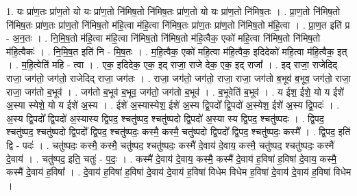 \documentclass[17pt]{extarticle}
\begin{document}
1. यः प्रा॑ण॒तः प्रा॑ण॒तो यो यः प्रा॑ण॒तो नि॑मिष॒तो नि॑मिष॒तः प्रा॑ण॒तो यो यः प्रा॑ण॒तो नि॑मिष॒तः । . प्रा॒ण॒तो नि॑मिष॒तो नि॑मिष॒तः प्रा॑ण॒तः प्रा॑ण॒तो नि॑मिष॒तो म॑हि॒त्वा म॑हि॒त्वा नि॑मिष॒तः प्रा॑ण॒तः प्रा॑ण॒तो नि॑मिष॒तो म॑हि॒त्वा । . प्रा॒ण॒त इति॑ प्र - अ॒न॒तः । . नि॒मि॒ष॒तो म॑हि॒त्वा म॑हि॒त्वा नि॑मिष॒तो नि॑मिष॒तो म॑हि॒त्वैक॒ एको॑ महि॒त्वा नि॑मिष॒तो नि॑मिष॒तो 
म॑हि॒त्वैकः॑ । . नि॒मि॒ष॒त इति॑ नि - मि॒ष॒तः । . म॒हि॒त्वैक॒ एको॑ महि॒त्वा म॑हि॒त्वैक॒ इदिदेको॑ महि॒त्वा म॑हि॒त्वैक॒ इत् । . म॒हि॒त्वेति॑ महि - त्वा । . एक॒ इदिदेक॒ एक॒ इद् राजा॒ राजे देक॒ एक॒ इद् राजा᳚ । . इद् राजा॒ राजेदिद् राजा॒ जग॑तो॒ जग॑तो॒ राजेदिद् राजा॒ जग॑तः । . राजा॒ जग॑तो॒ जग॑तो॒ राजा॒ राजा॒ जग॑तो ब॒भूव॑ ब॒भूव॒ जग॑तो॒ राजा॒ राजा॒ जग॑तो ब॒भूव॑ । . जग॑तो ब॒भूव॑ ब॒भूव॒ जग॑तो॒ जग॑तो ब॒भूव॑ । . ब॒भूवेति॑ ब॒भूव॑ । . य ईश॒ ईशे॒ यो य ईशे॑ अ॒स्या स्येशे॒ यो य ईशे॑ अ॒स्य । . ईशे॑ अ॒स्यास्येश॒ ईशे॑ अ॒स्य द्वि॒पदो᳚ द्वि॒पदो॑ अ॒स्येश॒ ईशे॑ अ॒स्य द्वि॒पदः॑ । . अ॒स्य द्वि॒पदो᳚ द्वि॒पदो॑ अ॒स्यास्य द्वि॒पद॒ श्चतु॑ष्पद॒ श्चतु॑ष्पदो द्वि॒पदो॑ अ॒स्या स्य द्वि॒पद॒ श्चतु॑ष्पदः । . द्वि॒पद॒ श्चतु॑ष्पद॒ श्चतु॑ष्पदो द्वि॒पदो᳚ द्वि॒पद॒ श्चतु॑ष्पदः॒ कस्मै॒ कस्मै॒ चतु॑ष्पदो द्वि॒पदो᳚ द्वि॒पद॒ श्चतु॑ष्पदः॒ कस्मै᳚ । . द्वि॒पद॒ इति॑ द्वि - पदः॑ । . चतु॑ष्पदः॒ कस्मै॒ कस्मै॒ चतु॑ष्पद॒ श्चतु॑ष्पदः॒ कस्मै॑ दे॒वाय॑ दे॒वाय॒ कस्मै॒ चतु॑ष्पद॒ श्चतु॑ष्पदः॒ कस्मै॑ दे॒वाय॑ । . चतु॑ष्पद॒ इति॒ चतुः॑ - प॒दः॒ । . कस्मै॑ दे॒वाय॑ दे॒वाय॒ कस्मै॒ कस्मै॑ दे॒वाय॑ ह॒विषा॑ ह॒विषा॑ दे॒वाय॒ कस्मै॒ कस्मै॑ दे॒वाय॑ ह॒विषा᳚ । . दे॒वाय॑ ह॒विषा॑ ह॒विषा॑ दे॒वाय॑ दे॒वाय॑ ह॒विषा॑ विधेम विधेम ह॒विषा॑ दे॒वाय॑ दे॒वाय॑ ह॒विषा॑ विधेम । \newline
\end{document}
